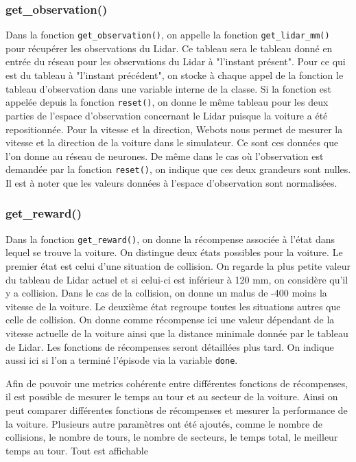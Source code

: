 \documentclass[french]{article}
\begin{document}
\subsubsection*{get\_observation()}
Dans la fonction \texttt{get\_observation()}, on appelle la fonction \texttt{get\_lidar\_mm()} pour récupérer 
les observations du Lidar. Ce tableau sera le tableau donné en entrée du réseau pour les observations du Lidar 
à "l'instant présent". Pour ce qui est du tableau à "l'instant précédent", on stocke à chaque appel de la 
fonction le tableau d'observation dans une variable interne de la classe. Si la fonction est appelée depuis 
la fonction \texttt{reset()}, on donne le même tableau pour les deux parties de l'espace d'observation concernant 
le Lidar puisque la voiture a été repositionnée. Pour la vitesse et la direction, Webots nous permet de mesurer 
la vitesse et la direction de la voiture dans le simulateur. Ce sont ces données que l'on donne au réseau de neurones. 
De même dans le cas où l'observation est demandée par la fonction \texttt{reset()}, on indique que ces deux grandeurs 
sont nulles. Il est à noter que les valeurs données à l'espace d'observation sont normalisées.

\subsubsection*{get\_reward()}
Dans la fonction \texttt{get\_reward()}, on donne la récompense associée à l'état dans lequel se trouve la voiture. 
On distingue deux états possibles pour la voiture. Le premier état est celui d'une situation de collision. 
On regarde la plus petite valeur du tableau de Lidar actuel et si celui-ci est inférieur à 120 mm, on considère 
qu'il y a collision. Dans le cas de la collision, on donne un malus de -400 moins la vitesse de la voiture. 
Le deuxième état regroupe toutes les situations autres que celle de collision. On donne comme récompense ici 
une valeur dépendant de la vitesse actuelle de la voiture ainsi que la distance minimale donnée par le tableau de Lidar. 
Les fonctions de récompenses seront détaillées plus tard. On indique aussi ici si l'on a terminé l'épisode via la 
variable \texttt{done}.

Afin de pouvoir une metrics cohérente entre différentes fonctions de récompenses, il est possible de mesurer le temps au tour et au secteur de la voiture. Ainsi on peut comparer différentes fonctions de récompenses et mesurer la performance de la voiture. Plusieurs autre paramètres ont été ajoutés, comme le nombre de collisions, le nombre de tours, le nombre de secteurs, le temps total, le meilleur temps au tour. Tout est affichable 
\end{document}
